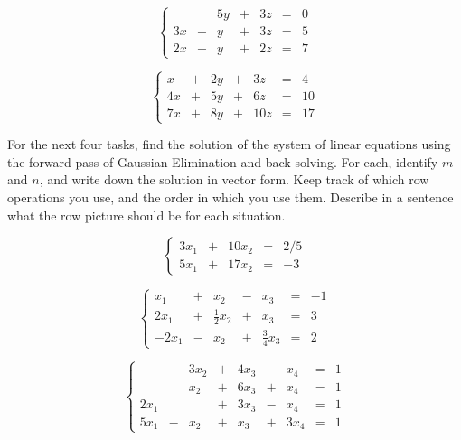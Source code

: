 \documentclass[cahier-main.tex]{subfiles}
\begin{document}
\begin{task}
\[
\left\{\begin{array}{rrrrrrr}
   &  & 5y & + & 3z & = & 0 \\
3x & + & y & + & 3z & = & 5 \\
2x & + & y & + & 2z & = & 7 
\end{array}\right.
\]
\end{task}


\begin{task}
\[
\left\{\begin{array}{rrrrrrr}
 x & + & 2y & + &  3z & = & 4 \\
4x & + & 5y & + &  6z & = & 10 \\
7x & + & 8y & + & 10z & = & 17
\end{array}\right.
\]
\end{task}

For the next four tasks, find the solution of the system of linear equations using the forward pass of Gaussian Elimination and back-solving. For each, identify $m$ and $n$, and write down the solution in vector form. Keep track of which row operations you use, and the order in which you use them. Describe in a sentence what the row picture should be for each situation.

\begin{task}
\[
\left\{\begin{array}{rrrrrrrrr}
3x_1 & + & 10x_2 & = & 2/5 \\
5x_1 & + & 17x_2 & = & -3 
     \end{array}\right.
\]
\end{task}

\begin{task}
\[
\left\{\begin{array}{rrrrrrrrr}
x_1 & + &            x_2 & - & x_3 & = & -1 \\
2x_1 & + & \frac{1}{2}x_2 & + & x_3 & = & 3 \\
-2x_1 & - &            x_2 & + &\frac{3}{4} x_3 & = & 2
\end{array}\right.
\]
\end{task}


\begin{task}
\[
\left\{\begin{array}{rrrrrrrrr}
     &   & 3x_2 & + & 4x_3 & - &  x_4 & = & 1 \\
     &   &  x_2 & + & 6x_3 & + &  x_4 & = & 1 \\
2x_1 &   &      & + & 3x_3 & - &  x_4 & = & 1 \\
5x_1 & - &  x_2 & + &  x_3 & + & 3x_4 & = & 1
\end{array}\right.
\]
\end{task}
\end{document}
